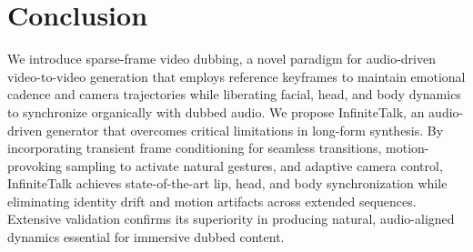 \section{Conclusion}

We introduce sparse-frame video dubbing, a novel paradigm for audio-driven video-to-video generation that employs reference keyframes to maintain emotional cadence and camera trajectories while liberating facial, head, and body dynamics to synchronize organically with dubbed audio. We propose InfiniteTalk, an audio-driven generator that overcomes critical limitations in long-form synthesis. By incorporating transient frame conditioning for seamless transitions, motion-provoking sampling to activate natural gestures, and adaptive camera control, InfiniteTalk achieves state-of-the-art lip, head, and body synchronization while eliminating identity drift and motion artifacts across extended sequences. Extensive validation confirms its superiority in producing natural, audio-aligned dynamics essential for immersive dubbed content.
